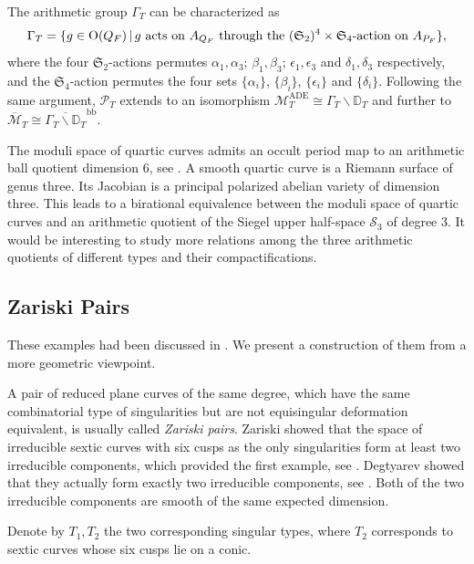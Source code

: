 \documentclass[
]{article}
\begin{document}
The arithmetic group \(\Gamma_{T}\) can be characterized as
\[\Gamma_{T} = \{ g\in\mathrm{O}(Q_F) \,|\, g \textup{ acts on } A_{Q_F} \textup{ through the } (\mathfrak{S}_2)^4\times\mathfrak{S}_4\textup{-action on } A_{P_F} \},\]
where the four \(\mathfrak{S}_2\)-actions permutes
\(\alpha_1,\alpha_3\); \(\beta_1,\beta_3\); \(\epsilon_1,\epsilon_3\)
and \(\delta_1,\delta_3\) respectively, and the
\(\mathfrak{S}_4\)-action permutes the four sets \(\{\alpha_i\}\),
\(\{\beta_i\}\), \(\{\epsilon_i\}\) and \(\{\delta_i\}\). Following the
same argument, \(\mathscr{P}_{T}\) extends to an isomorphism
\(\mathcal{M}_{T}^{\mathrm{ADE}} \cong \Gamma_{T} \backslash \mathbb{D}_{T}\)
and further to
\(\overline{\mathcal{M}}_{T} \cong \overline{\Gamma_{T} \backslash \mathbb{D}_{T}}^{\mathrm{bb}}\).

The moduli space of quartic curves admits an occult period map to an
arithmetic ball quotient dimension \(6\), see \cite{kondo2011moduli}. A
smooth quartic curve is a Riemann surface of genus three. Its Jacobian
is a principal polarized abelian variety of dimension three. This leads
to a birational equivalence between the moduli space of quartic curves
and an arithmetic quotient of the Siegel upper half-space
\(\mathcal{S}_3\) of degree \(3\). It would be interesting to study more
relations among the three arithmetic quotients of different types and
their compactifications.

\subsection{Zariski Pairs}\label{subsec:ux20Zariskiux20pair}

These examples had been discussed in
\cite[\S 3]{yang2012discriminantal}. We present a construction of them
from a more geometric viewpoint.

A pair of reduced plane curves of the same degree, which have the same
combinatorial type of singularities but are not equisingular deformation
equivalent, is usually called \emph{Zariski pairs}. Zariski showed that
the space of irreducible sextic curves with six cusps as the only
singularities form at least two irreducible components, which provided
the first example, see \cite{zariski1931irregularity}. Degtyarev showed
that they actually form exactly two irreducible components, see
\cite[Theorem 5.3.2]{degtyarev2008deformations}. Both of the two
irreducible components are smooth of the same expected dimension.

Denote by \(T_1,T_2\) the two corresponding singular types, where
\(T_2\) corresponds to sextic curves whose six cusps lie on a conic.
\end{document}
